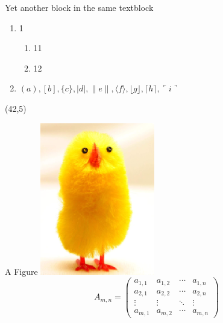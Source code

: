 \documentclass[14pt,final]{beamer}
\begin{document}
\begin{frame}{}
\begin{textblock}{19.3}
\begin{block}{Yet another block in the same textblock}
\begin{enumerate}
\item 1 \cite{latexcompanion}
\begin{enumerate}
\item 11
\item 12
\end{enumerate}
\item $( a ), [ b ], \{ c \}, | d |, \| e \|,
\langle f \rangle, \lfloor g \rfloor,
\lceil h \rceil, \ulcorner i \urcorner$
\end{enumerate}
\end{block}

\end{textblock}



\begin{textblock}{16.6}(42,5)
\begin{block}{A Figure}
\includegraphics[width=\textwidth]{figures/Chick1.png}
\begin{equation}
A_{m,n} = 
 \begin{pmatrix}
  a_{1,1} & a_{1,2} & \cdots & a_{1,n} \\
  a_{2,1} & a_{2,2} & \cdots & a_{2,n} \\
  \vdots  & \vdots  & \ddots & \vdots  \\
  a_{m,1} & a_{m,2} & \cdots & a_{m,n} 
 \end{pmatrix}
\end{equation}


\end{block}
\end{textblock}
\end{frame}
\end{document}
